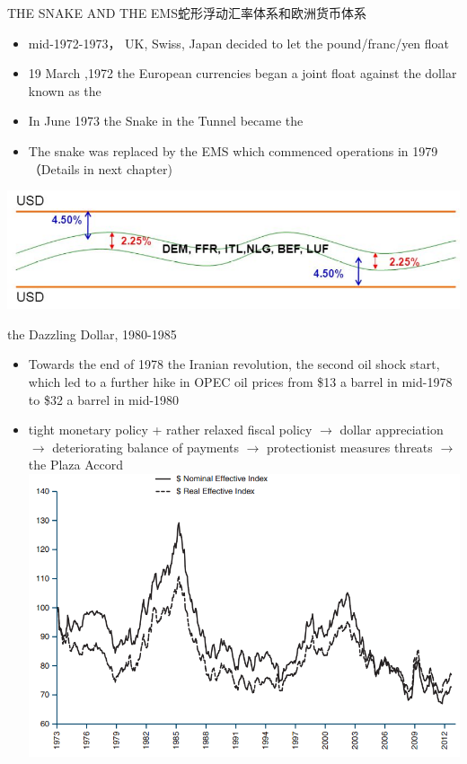 \documentclass[10pt,hyperref={CJKbookmarks=true},xcolor=dvipsnames,aspectratio=169]{beamer}
\begin{document}
\begin{frame}{THE SNAKE AND THE EMS蛇形浮动汇率体系和欧洲货币体系}

			\begin{itemize}			
				\item mid-1972-1973， UK, Swiss, Japan decided to let the pound/franc/yen float
				\item 19 March ,1972 the European currencies began a joint float against the	dollar known as the 
				\item In June 1973 the Snake in the Tunnel became the 
				\item The snake was replaced by the EMS which commenced operations in 1979（Details in next chapter)
			\end{itemize}
		\centering
\includegraphics[scale=0.5]{fig/systems/snake}
\end{frame}

\begin{frame}{the Dazzling Dollar, 1980-1985}
\begin{itemize}			
	\item Towards the end of 1978 the Iranian revolution, the second oil shock start, which led
	to a further hike in OPEC oil prices from \$13 a barrel in mid-1978 to \$32 a barrel
	in mid-1980
	\item tight monetary policy + rather relaxed fiscal policy $\longrightarrow$ dollar appreciation $\longrightarrow$  deteriorating balance of payments $\longrightarrow$ protectionist measures threats $\longrightarrow$  the Plaza Accord
		\centering
\includegraphics[scale=0.45]{fig/systems/dollar}
\end{itemize}
\end{frame}
\end{document}
